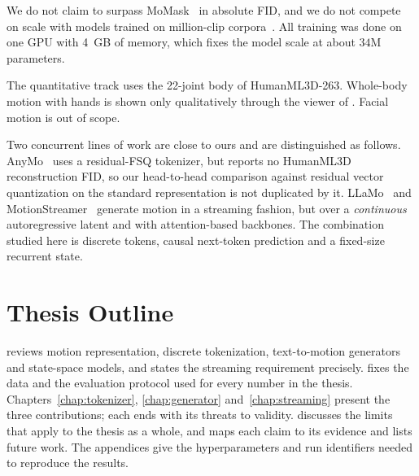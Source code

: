 We do not claim to surpass MoMask~\cite{guo2024momask} in absolute FID, and we do not compete on scale with models trained on million-clip corpora~\cite{wang2024beingm0,zhang2024lmm,fan2025motionmillion}. All training was done on one GPU with 4~GB of memory, which fixes the model scale at about $34$M parameters.

The quantitative track uses the 22-joint body of HumanML3D-263. Whole-body motion with hands is shown only qualitatively through the viewer of . Facial motion is out of scope.

Two concurrent lines of work are close to ours and are distinguished as follows. AnyMo~\cite{li2026anymo} uses a residual-FSQ tokenizer, but reports no HumanML3D reconstruction FID, so our head-to-head comparison against residual vector quantization on the standard representation is not duplicated by it. LLaMo~\cite{li2026llamo} and MotionStreamer~\cite{xiao2025motionstreamer} generate motion in a streaming fashion, but over a \emph{continuous} autoregressive latent and with attention-based backbones. The combination studied here is discrete tokens, causal next-token prediction and a fixed-size recurrent state.

\section{Thesis Outline}
\label{sec:intro_outline}

 reviews motion representation, discrete tokenization, text-to-motion generators and state-space models, and states the streaming requirement precisely.  fixes the data and the evaluation protocol used for every number in the thesis. Chapters~\ref{chap:tokenizer}, \ref{chap:generator} and~\ref{chap:streaming} present the three contributions; each ends with its threats to validity.  discusses the limits that apply to the thesis as a whole, and  maps each claim to its evidence and lists future work. The appendices give the hyperparameters and run identifiers needed to reproduce the results.
